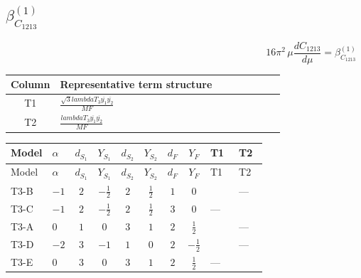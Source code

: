 \documentclass[8pt]{article}
\begin{document}
\begin{landscape}
\section*{$\beta_{C_{1213}}^{(1)}$}
\[16\pi^2\,\mu\frac{d C_{1213}}{d\mu}=\beta_{C_{1213}}^{(1)}\]
\begin{center}
\begin{tabular}{@{}c >{\raggedright\arraybackslash}p{0.82\linewidth}@{}}
\toprule
Column & Representative term structure \\
\midrule
T1 & \(\displaystyle \frac{\sqrt{3} lambdaT_{3} \overline{y_{1}} \overline{y_{2}}}{MF}\) \\
\midrule
T2 & \(\displaystyle \frac{lambdaT_{3} \overline{y_{1}} \overline{y_{2}}}{MF}\) \\
\midrule
\bottomrule
\end{tabular}
\end{center}
\smallskip
\tiny
\begin{longtable}{@{}llcccccc >{\raggedright\arraybackslash}p{0.21\linewidth} >{\raggedright\arraybackslash}p{0.21\linewidth}@{}}
\toprule
Model & $\alpha$ & $d_{S_1}$ & $Y_{S_1}$ & $d_{S_2}$ & $Y_{S_2}$ & $d_F$ & $Y_F$ & T1 & T2 \\
\midrule
\endfirsthead
\toprule
Model & $\alpha$ & $d_{S_1}$ & $Y_{S_1}$ & $d_{S_2}$ & $Y_{S_2}$ & $d_F$ & $Y_F$ & T1 & T2 \\
\midrule
\endhead
T3-B & $-1$ & $2$ & $-\frac{1}{2}$ & $2$ & $\frac{1}{2}$ & $1$ & $0$ & \scriptsize\adjustbox{max width=\linewidth}{$\begin{gathered} - \frac{\sqrt{3} lambdaT_{3} \overline{y_{1}} \overline{y_{2}}}{3 MF}\end{gathered}$} & --- \\
\midrule
T3-C & $-1$ & $2$ & $-\frac{1}{2}$ & $2$ & $\frac{1}{2}$ & $3$ & $0$ & --- & \scriptsize\adjustbox{max width=\linewidth}{$\begin{gathered} \frac{2 lambdaT_{3} \overline{y_{1}} \overline{y_{2}}}{3 MF}\end{gathered}$} \\
\midrule
T3-A & $0$ & $1$ & $0$ & $3$ & $1$ & $2$ & $\frac{1}{2}$ & \scriptsize\adjustbox{max width=\linewidth}{$\begin{gathered} - \frac{\sqrt{3} lambdaT_{3} \overline{y_{1}} \overline{y_{2}}}{3 MF}\end{gathered}$} & --- \\
\midrule
T3-D & $-2$ & $3$ & $-1$ & $1$ & $0$ & $2$ & $-\frac{1}{2}$ & \scriptsize\adjustbox{max width=\linewidth}{$\begin{gathered} - \frac{\sqrt{3} lambdaT_{3} \overline{y_{1}} \overline{y_{2}}}{3 MF}\end{gathered}$} & --- \\
\midrule
T3-E & $0$ & $3$ & $0$ & $3$ & $1$ & $2$ & $\frac{1}{2}$ & --- & \scriptsize\adjustbox{max width=\linewidth}{$\begin{gathered} \frac{lambdaT_{3} \overline{y_{1}} \overline{y_{2}}}{MF}\end{gathered}$} \\
\midrule
\bottomrule
\end{longtable}
\clearpage

\end{landscape}
\end{document}
